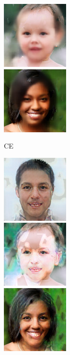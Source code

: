 \begin{figure}[t]
\begin{subfigure}[t]{0.25\textwidth}
      \includegraphics[height=\ffhqimgheight]{figs/cigcvae/image-samples/ffhq256/freeform_ce_13_samples.jpg}\\
      \includegraphics[height=\ffhqimgheight]{figs/cigcvae/image-samples/ffhq256/freeform_ce_32_samples.jpg}
      \caption{\scriptsize CE}
    \end{subfigure}
    \begin{subfigure}[t]{0.25\textwidth}
      \centering
      \includegraphics[height=\ffhqimgheight]{figs/cigcvae/image-samples/ffhq256/freeform_rfr_0_samples.jpg}\\
      \includegraphics[height=\ffhqimgheight]{figs/cigcvae/image-samples/ffhq256/freeform_rfr_13_samples.jpg}\\
      \includegraphics[height=\ffhqimgheight]{figs/cigcvae/image-samples/ffhq256/freeform_rfr_32_samples.jpg}

\end{subfigure}
\end{figure}
